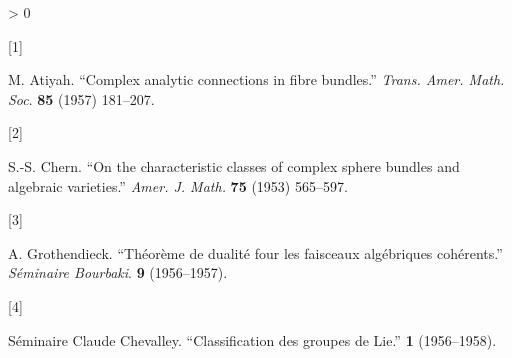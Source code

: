 \documentclass{article}
\newlength{\cslhangindent}
\newlength{\csllabelwidth}
\newenvironment{CSLReferences}[3] %
 {%
  \setlength{\parindent}{0pt}
  \ifodd #1 \everypar{\setlength{\hangindent}{\cslhangindent}}\ignorespaces\fi
  \ifnum #2 > 0
  \setlength{\parskip}{#2\baselineskip}
  \fi
 }%
 {}
\newcommand{\CSLLeftMargin}[1]{\parbox[t]{\maxof{\widthof{#1}}{\csllabelwidth}}{#1}}
\newcommand{\CSLRightInline}[1]{\parbox[t]{\linewidth}{#1}}
\begin{document}
\hypertarget{refs}{}
\begin{CSLReferences}{0}{0}
\leavevmode\hypertarget{ref-1}{}%
\CSLLeftMargin{{[}1{]} }
\CSLRightInline{M. Atiyah. {``Complex analytic connections in fibre bundles.''} \emph{Trans. Amer. Math. Soc}. \textbf{85} (1957) 181--207.}

\leavevmode\hypertarget{ref-2}{}%
\CSLLeftMargin{{[}2{]} }
\CSLRightInline{S.-S. Chern. {``On the characteristic classes of complex sphere bundles and algebraic varieties.''} \emph{Amer. J. Math.} \textbf{75} (1953) 565--597.}

\leavevmode\hypertarget{ref-3}{}%
\CSLLeftMargin{{[}3{]} }
\CSLRightInline{A. Grothendieck. {``Théorème de dualité four les faisceaux algébriques cohérents.''} \emph{Séminaire Bourbaki}. \textbf{9} (1956--1957).}

\leavevmode\hypertarget{ref-4}{}%
\CSLLeftMargin{{[}4{]} }
\CSLRightInline{Séminaire Claude Chevalley. {``Classification des groupes de {Lie}.''} \textbf{1} (1956--1958).}

\end{CSLReferences}
\end{document}
